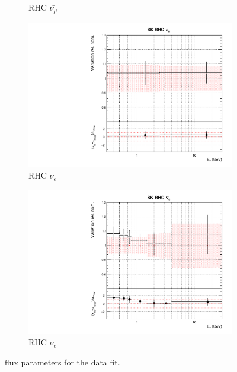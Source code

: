 \begin{figure}[!htbp]
\begin{subfigure}{0.45\textwidth}
  \caption{\SK RHC $\bar{\nu_{\mu}}$}
\end{subfigure}
\begin{subfigure}{0.45\textwidth}
  \centering
  \includegraphics[width=0.75\linewidth]{figs/datflux14}
  \caption{\SK RHC $\nu_{e}$}
\end{subfigure}
\begin{subfigure}{0.45\textwidth}
  \centering
  \includegraphics[width=0.75\linewidth]{figs/datflux15}
  \caption{\SK RHC $\bar{\nu_e}$}
\end{subfigure}
\caption{\SK flux parameters for the data fit.}
\label{fig:datfluxSKapp}
\end{figure}

